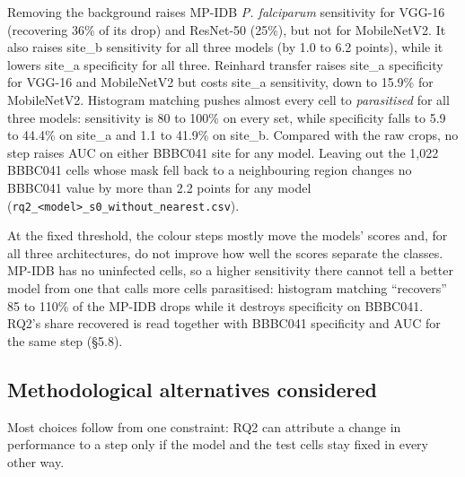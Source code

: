 \documentclass[11pt,a4paper]{article}
\begin{document}
Removing the background raises MP-IDB \emph{P. falciparum} sensitivity for VGG-16 (recovering 36\% of its drop) and ResNet-50 (25\%), but not for \mbox{MobileNetV2}. It also raises site\_\allowbreak{}b sensitivity for all three models (by 1.0 to 6.2 points), while it lowers site\_\allowbreak{}a specificity for all three. Reinhard transfer raises site\_\allowbreak{}a specificity for VGG-16 and \mbox{MobileNetV2} but costs site\_\allowbreak{}a sensitivity, down to 15.9\% for \mbox{MobileNetV2}. Histogram matching pushes almost every cell to \emph{parasitised} for all three models: sensitivity is 80 to 100\% on every set, while specificity falls to 5.9 to 44.4\% on site\_\allowbreak{}a and 1.1 to 41.9\% on site\_\allowbreak{}b. Compared with the raw crops, no step raises AUC on either BBBC041 site for any model. Leaving out the 1,022 BBBC041 cells whose mask fell back to a neighbouring region changes no BBBC041 value by more than 2.2 points for any model (\texttt{rq2\_\allowbreak{}<model>\_\allowbreak{}s0\_\allowbreak{}without\_\allowbreak{}nearest.\allowbreak{}csv}).

At the fixed threshold, the colour steps mostly move the models' scores and, for all three architectures, do not improve how well the scores separate the classes. MP-IDB has no uninfected cells, so a higher sensitivity there cannot tell a better model from one that calls more cells parasitised: histogram matching ``recovers'' 85 to 110\% of the MP-IDB drops while it destroys specificity on BBBC041. RQ2's share recovered is read together with BBBC041 specificity and AUC for the same step (\S{}5.8).

\subsection{Methodological alternatives considered}

Most choices follow from one constraint: RQ2 can attribute a change in performance to a step only if the model and the test cells stay fixed in every other way.
\end{document}
